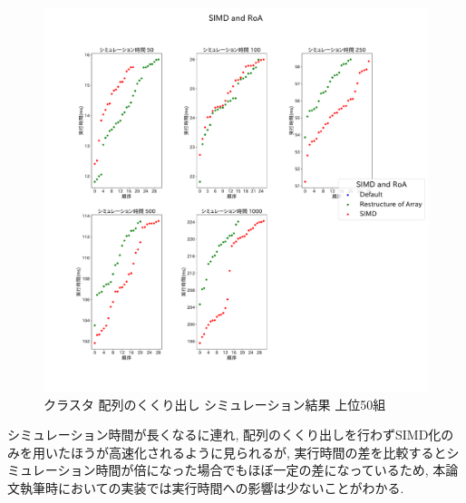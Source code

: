 \begin{figure}[htb]
\begin{center}
    \includegraphics[width=14cm]{./images/cluster-top50-SIMD-and-RoA.pdf}
    \caption{クラスタ 配列のくくり出し シミュレーション結果 上位50組}
    \label{fig:cluster-roa-top50}
\end{center}
\end{figure}
シミュレーション時間が長くなるに連れ,
配列のくくり出しを行わずSIMD化のみを用いたほうが高速化されるように見られるが,
実行時間の差を比較するとシミュレーション時間が倍になった場合でもほぼ一定の差になっているため,
本論文執筆時においての実装では実行時間への影響は少ないことがわかる.\\


